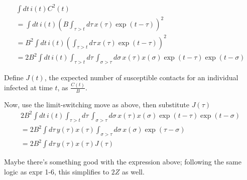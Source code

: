\documentclass[12pt]{article}
\begin{document}
\begin{eqnarray}
\int{dt\, i(t) C^2(t)}
	\\ = \int{dt\, i(t) \left(
		B \int_{\tau>t}{d\tau\, x(\tau) \exp(t-\tau)}
	\right)^2}
	\\ = B^2 \int{dt\, i(t) \left(
		\int_{\tau>t}{d\tau\, x(\tau) \exp(t-\tau)}
	\right)^2}
	\\ =  2B^2 \int{dt\, i(t) \int_{\tau>t}{d\tau\, \int_{\sigma>\tau}{d\sigma\, x(\tau) x(\sigma) \exp(t-\tau)\exp(t-\sigma)}}}
\end{eqnarray}

Define $J(t)$, the expected number of susceptible contacts for an individual infected at time $t$, as $\frac{C(t)}{B}$.

Now, use the limit-switching move as above, then substitute $J(\tau)$
\begin{eqnarray}
2B^2 \int{dt\, i(t) \int_{\tau>t}{d\tau\, \int_{\sigma>\tau}{d\sigma\, x(\tau) x(\sigma) \exp(t-\tau)\exp(t-\sigma)}}}
  \\ = 2B^2 \int{d\tau\, y(\tau)x(\tau) \int_{\sigma > \tau}{d\sigma\, x(\sigma)\exp(\tau-\sigma)}}
  \\ = 2B^2 \int{d\tau\, y(\tau)x(\tau)J(\tau)}
\end{eqnarray}

Maybe there's something good with the expression above; following the same logic as expr 1-6, this simplifies to $2Z$ as well.



%
\end{document}
